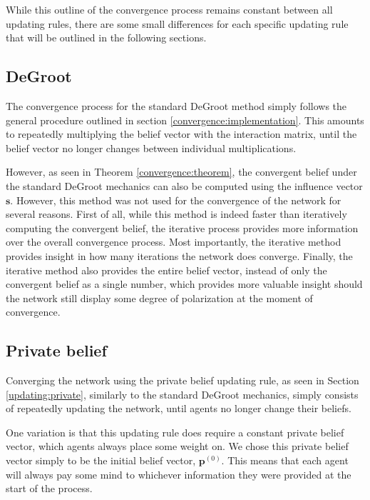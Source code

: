 \documentclass[a4paper, 12pt]{report}
\begin{document}
\noindent While this outline of the convergence process remains constant between all updating rules, there are some small differences for each specific updating rule that will be outlined in the following sections.

\subsection{DeGroot}
\label{implementation:degroot}
The convergence process for the standard DeGroot method simply follows the general procedure outlined in section \ref{convergence:implementation}. This amounts to repeatedly multiplying the belief vector with the interaction matrix, until the belief vector no longer changes between individual multiplications. 

\noindent However, as seen in Theorem \ref{convergence:theorem}, the convergent belief under the standard DeGroot mechanics can also be computed using the influence vector $\bm{s}$. However, this method was not used for the convergence of the network for several reasons. First of all, while this method is indeed faster than iteratively computing the convergent belief, the iterative process provides more information over the overall convergence process. Most importantly, the iterative method provides insight in how many iterations the network does converge. Finally, the iterative method also provides the entire belief vector, instead of only the convergent belief as a single number, which provides more valuable insight should the network still display some degree of polarization at the moment of convergence.

\subsection{Private belief}
\label{implementation:private}
Converging the network using the private belief updating rule, as seen in Section \ref{updating:private}, similarly to the standard DeGroot mechanics, simply consists of repeatedly updating the network, until agents no longer change their beliefs. 

\noindent One variation is that this updating rule does require a constant private belief vector, which agents always place some weight on. We chose this private belief vector simply to be the initial belief vector, $\bm{p}^{(0)}$. This means that each agent will always pay some mind to whichever information they were provided at the start of the process.
\end{document}
